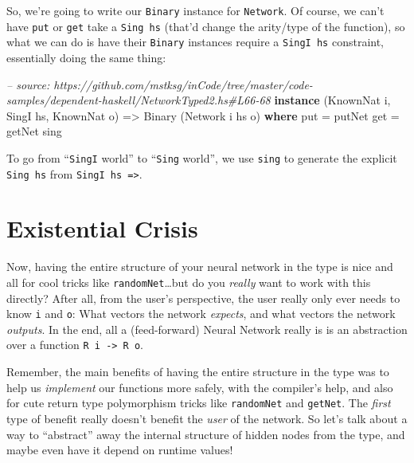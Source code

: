\documentclass[]{article}
\newenvironment{Shaded}{}{}
\newcommand{\KeywordTok}[1]{\textcolor[rgb]{0.00,0.44,0.13}{\textbf{{#1}}}}
\newcommand{\DataTypeTok}[1]{\textcolor[rgb]{0.56,0.13,0.00}{{#1}}}
\newcommand{\CommentTok}[1]{\textcolor[rgb]{0.38,0.63,0.69}{\textit{{#1}}}}
\newcommand{\OtherTok}[1]{\textcolor[rgb]{0.00,0.44,0.13}{{#1}}}
\newcommand{\FunctionTok}[1]{\textcolor[rgb]{0.02,0.16,0.49}{{#1}}}
\newcommand{\NormalTok}[1]{{#1}}
\begin{document}
So, we're going to write our \texttt{Binary} instance for \texttt{Network}. Of
course, we can't have \texttt{put} or \texttt{get} take a \texttt{Sing\ hs}
(that'd change the arity/type of the function), so what we can do is have their
\texttt{Binary} instances require a \texttt{SingI\ hs} constraint, essentially
doing the same thing:

\begin{Shaded}
\begin{Highlighting}[]
\CommentTok{-- source: https://github.com/mstksg/inCode/tree/master/code-samples/dependent-haskell/NetworkTyped2.hs#L66-68}
\KeywordTok{instance} \NormalTok{(}\DataTypeTok{KnownNat} \NormalTok{i, }\DataTypeTok{SingI} \NormalTok{hs, }\DataTypeTok{KnownNat} \NormalTok{o) }\OtherTok{=>} \DataTypeTok{Binary} \NormalTok{(}\DataTypeTok{Network} \NormalTok{i hs o) }\KeywordTok{where}
    \NormalTok{put }\FunctionTok{=} \NormalTok{putNet}
    \NormalTok{get }\FunctionTok{=} \NormalTok{getNet sing}
\end{Highlighting}
\end{Shaded}

To go from ``\texttt{SingI} world'' to ``\texttt{Sing} world'', we use
\texttt{sing} to generate the explicit \texttt{Sing\ hs} from
\texttt{SingI\ hs\ =\textgreater{}}.

\section{Existential Crisis}\label{existential-crisis}

Now, having the entire structure of your neural network in the type is nice and
all for cool tricks like \texttt{randomNet}\ldots{}but do you \emph{really} want
to work with this directly? After all, from the user's perspective, the user
really only ever needs to know \texttt{i} and \texttt{o}: What vectors the
network \emph{expects}, and what vectors the network \emph{outputs}. In the end,
all a (feed-forward) Neural Network really is is an abstraction over a function
\texttt{R\ i\ -\textgreater{}\ R\ o}.

Remember, the main benefits of having the entire structure in the type was to
help us \emph{implement} our functions more safely, with the compiler's help,
and also for cute return type polymorphism tricks like \texttt{randomNet} and
\texttt{getNet}. The \emph{first} type of benefit really doesn't benefit the
\emph{user} of the network. So let's talk about a way to ``abstract'' away the
internal structure of hidden nodes from the type, and maybe even have it depend
on runtime values!
\end{document}
